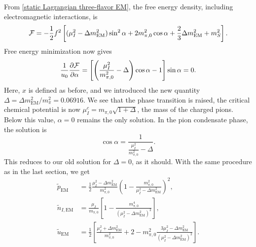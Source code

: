From \autoref{static Lagrangian three-flavor EM}, the free energy density, including electromagnetic interactions, is
%
\begin{equation}
    \mathcal{F} =
    -\frac{1}{2} f^2
    \left[
        (\mu_I^2 - \Delta m_\text{EM}^2)\sin^2\alpha + 2 m_{\pi,0}^2\cos\alpha 
        + \frac{2}{3}\Delta m_\text{EM}^2 + m_S^2
    \right].
\end{equation}
%
Free energy minimization now gives
%
\begin{equation}
    \frac{1}{u_0}\pdv{\mathcal{F}}{\alpha}
    = 
    \left[ \left( \frac{\mu_I^2}{m_{\pi,0}^2} - \Delta \right) \cos \alpha - 1\right] \sin \alpha = 0.
\end{equation}
%
Here, $x$ is defined as before, and we introduced the new quantity $\Delta = \Delta m_{\text{EM}}^2 / m_\pi^2= 0.06916$.
We see that the phase transition is raised, the critical chemical potential is now $\mu_I^c = m_{\pi,0} \sqrt{1 + \Delta}$, the mass of the charged pions.
Below this value, $\alpha = 0$ remains the only solution.
In the pion condensate phase, the solution is
%
\begin{equation}
    \cos \alpha 
    = \frac{1}{\frac{\mu_I^2}{m_{\pi,0}^2} -  \Delta}.
\end{equation}
%
This reduces to our old solution for $\Delta = 0$, as it should.
With the same procedure as in the last section, we get
%
\begingroup
\allowdisplaybreaks
\begin{align}
    \label{pressure with em interaction}
    \tilde p_\text{EM}
    & = \frac{1}{2} \frac{\mu_I^2 - \Delta m_\text{EM}^2}{m_{\pi,0}^2}
    \left(
        1-  \frac{m_{\pi,0}^2}{ \mu_I^2 - \Delta m_\text{EM}^2 }
    \right)^2, \\
    \tilde n_{I,\text{EM}} & =
    \frac{\mu_I}{m_{\pi,0}}
    \left[  1 - \frac{m_{\pi,0}^4}{(\mu_I^2 - \Delta m_\text{EM}^2)^2} \right],\\
    \tilde u_\text{EM}
    &= \frac{1}{2} 
    \left[
        \frac{\mu_I^2+\Delta m_\text{EM}^2}{m_{\pi,0}^2}+ 2
        - m_{\pi,0}^2 \frac{3 {\mu_I^2} - \Delta m_\text{EM}^2}
        {\left( \mu_I^2- \Delta m_\text{EM}^2\right)^2}
    \right].
\end{align}
